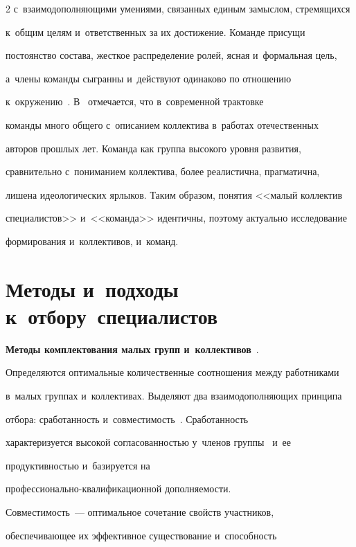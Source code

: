 \begin{multicols}{2}
с~взаимодополняющими умениями, связанных единым за\-мыс\-лом, стремящихся 

к~общим целям и~ответственных за их достижение. Команде присущи 

постоянство со\-ста\-ва, жест\-кое распределение ролей, ясная и~формальная цель, 

а~члены команды сыгранны и~действуют одинаково по отношению 

к~окру\-же\-нию~\cite{12-r}. В~\cite{4-r} отмечается, что в~современной трактовке 

команды много общего с~описанием коллектива в~работах отечественных 

авторов прош\-лых лет. Команда как группа высокого уровня развития, 

сравнительно с~пониманием коллектива, более реалистична, прагматична, 

лишена идеологических ярлыков. Таким образом, понятия <<малый коллектив 

специалистов>> и~<<команда>> идентичны, поэтому актуально исследование 

формирования и~коллективов, и~команд. 

  

\section{Методы и~подходы к~отбору~специалистов }



  \textbf{Методы комплектования малых групп и~коллективов}~\cite{13-r}. 

Определяются оптимальные количественные соотношения между работниками 

в~малых группах и~коллективах. Выделяют два взаимодополняющих принципа 

отбора: сра\-бо\-тан\-ность и~со\-вмес\-ти\-мость~\cite{14-r}. Сра\-бо\-тан\-ность 

характеризуется высокой со\-гла\-со\-ван\-ностью у~членов группы~\cite{15-r} и~ее\linebreak 

про\-дук\-тив\-ностью и~базируется на  

про\-фес\-сио\-наль\-но-ква\-ли\-фи\-ка\-ци\-он\-ной до\-пол\-ня\-емости. 

Совместимость~--- оптимальное сочетание свойств участников, 

обес\-пе\-чи\-ва\-ющее их эффективное \mbox{существование} и~спо\-соб\-ность 


\end{multicols}
